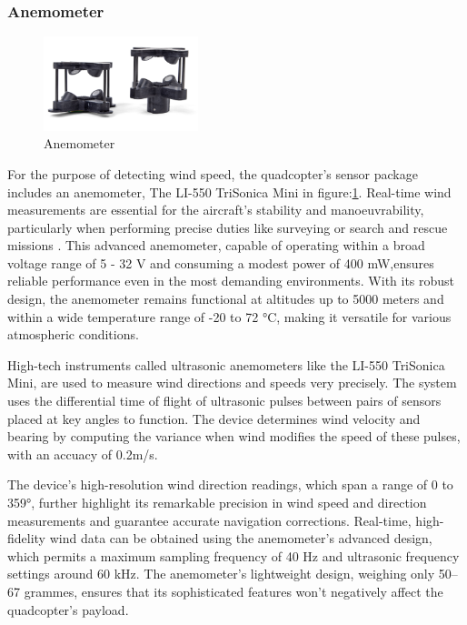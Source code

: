 \documentclass{article}
\begin{document}
\subsubsection{Anemometer}
\begin{figure}[H]
  \centering
  \includegraphics[width=0.4\textwidth]{Pictures/Anemometer.png}
  \caption{Anemometer}
  \label{fig:Anemometer}
\end{figure}

For the purpose of detecting wind speed, the quadcopter's sensor package
includes an anemometer, The LI-550 TriSonica Mini in
figure:\ref{fig:Anemometer}. Real-time wind measurements are essential for the
aircraft's stability and manoeuvrability, particularly when performing precise
duties like surveying or search and rescue missions \cite{uav_wilderness_sar}.
This advanced anemometer, capable of operating within a broad voltage range of 5
- 32 V and consuming a modest power of 400 mW,ensures reliable performance even
in the most demanding environments. With its robust design, the anemometer
remains functional at altitudes up to 5000 meters and within a wide temperature
range of -20 to 72 °C, making it versatile for various atmospheric conditions.

High-tech instruments called ultrasonic anemometers like the LI-550 TriSonica
Mini, are used to measure wind directions and speeds very precisely. The system
uses the differential time of flight of ultrasonic pulses between pairs of
sensors placed at key angles to function. The device determines wind velocity
and bearing by computing the variance when wind modifies the speed of these
pulses, with an accuacy of 0.2m/s.

The device's high-resolution wind direction readings, which span a range of 0 to
359°, further highlight its remarkable precision in wind speed and direction
measurements and guarantee accurate navigation corrections. Real-time,
high-fidelity wind data can be obtained using the anemometer's advanced design,
which permits a maximum sampling frequency of 40 Hz and ultrasonic frequency
settings around 60 kHz. The anemometer's lightweight design, weighing only 50–67
grammes, ensures that its sophisticated features won't negatively affect the
quadcopter's payload.
\end{document}
